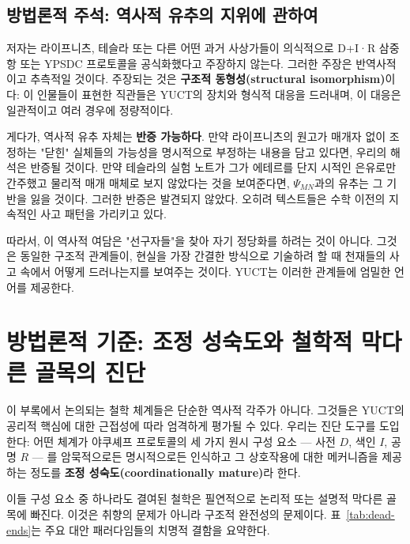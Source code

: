\documentclass[12pt,a4paper]{article}
\begin{document}
	\subsection{방법론적 주석: 역사적 유추의 지위에 관하여}
	\label{subsec:methodological-note}
	
	저자는 라이프니츠, 테슬라 또는 다른 어떤 과거 사상가들이 의식적으로 D+I·R 삼중항 또는 YPSDC 프로토콜을 공식화했다고 주장하지 않는다. 그러한 주장은 반역사적이고 추측적일 것이다. 주장되는 것은 \textbf{구조적 동형성(structural isomorphism)}이다: 이 인물들이 표현한 직관들은 YUCT의 장치와 형식적 대응을 드러내며, 이 대응은 일관적이고 여러 경우에 정량적이다.
	
	게다가, 역사적 유추 자체는 \textbf{반증 가능하다}. 만약 라이프니츠의 원고가 매개자 없이 조정하는 "닫힌" 실체들의 가능성을 명시적으로 부정하는 내용을 담고 있다면, 우리의 해석은 반증될 것이다. 만약 테슬라의 실험 노트가 그가 에테르를 단지 시적인 은유로만 간주했고 물리적 매개 매체로 보지 않았다는 것을 보여준다면, \(\Psi_{MN}\)과의 유추는 그 기반을 잃을 것이다. 그러한 반증은 발견되지 않았다. 오히려 텍스트들은 수학 이전의 지속적인 사고 패턴을 가리키고 있다.
	
	따라서, 이 역사적 여담은 "선구자들"을 찾아 자기 정당화를 하려는 것이 아니다. 그것은 동일한 구조적 관계들이, 현실을 가장 간결한 방식으로 기술하려 할 때 천재들의 사고 속에서 어떻게 드러나는지를 보여주는 것이다. YUCT는 이러한 관계들에 엄밀한 언어를 제공한다.
	
	\section{방법론적 기준: 조정 성숙도와 철학적 막다른 골목의 진단}
	\label{sec:methodological-criterion}
	
	이 부록에서 논의되는 철학 체계들은 단순한 역사적 각주가 아니다. 그것들은 YUCT의 공리적 핵심에 대한 근접성에 따라 엄격하게 평가될 수 있다. 우리는 진단 도구를 도입한다: 어떤 체계가 야쿠셰프 프로토콜의 세 가지 원시 구성 요소 --- 사전 \(D\), 색인 \(I\), 공명 \(R\) --- 를 암묵적으로든 명시적으로든 인식하고 그 상호작용에 대한 메커니즘을 제공하는 정도를 \textbf{조정 성숙도(coordinationally mature)}라 한다.
	
	이들 구성 요소 중 하나라도 결여된 철학은 필연적으로 논리적 또는 설명적 막다른 골목에 빠진다. 이것은 취향의 문제가 아니라 구조적 완전성의 문제이다. 표~\ref{tab:dead-ends}는 주요 대안 패러다임들의 치명적 결함을 요약한다.
	
\end{document}
